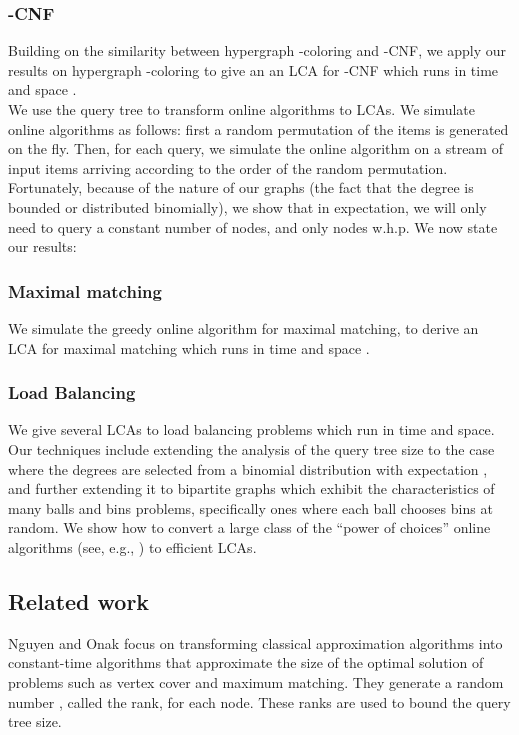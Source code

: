 \documentclass[english, oribibl]{llncs}
\begin{document}
\subsubsection{-CNF}
Building on the similarity between hypergraph -coloring and -CNF, we  apply our results on hypergraph -coloring to give an an LCA for -CNF which runs in time and space .\\

We use the query tree to transform online algorithms to LCAs. We simulate online algorithms as follows: first a random permutation
of the items is generated on the fly. Then, for each query, we simulate the online algorithm on a stream of input items arriving according to
the order of the random permutation. Fortunately, because of the nature of our graphs (the fact that the degree is bounded or distributed binomially), we show that in expectation, we will only need to query a constant number of nodes, and only  nodes w.h.p. We now state our results:

\subsubsection{Maximal matching}
We simulate the greedy online algorithm for maximal matching, to derive an LCA for maximal matching which runs in time and space .

\subsubsection{Load Balancing}
 We give several LCAs to load balancing problems which run in  time and space. Our techniques include extending 
 the analysis of the query tree size to  the case where the degrees are
selected from a binomial distribution with expectation , and further extending it to bipartite graphs which exhibit 
the characteristics of many balls and bins problems, specifically ones where each ball chooses  bins at random. We show how to convert a large class of the ``power of  choices'' 
online algorithms (see, e.g., \cite{ABK+99, BCS+06, TW07}) to efficient
LCAs.


\subsection{Related work}
Nguyen and Onak \cite{NO08} focus on transforming classical approximation algorithms into constant-time algorithms that approximate the size of the optimal solution of problems such as vertex cover and  maximum matching. They generate a random number , called the rank, for each node. These ranks are used to bound the query tree size. 
\end{document}
